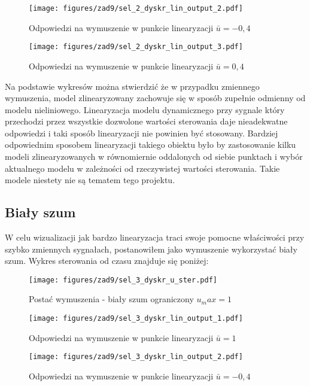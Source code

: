 \documentclass[a4paper,titlepage,11pt,floatssmall]{mwrep}
\begin{document}
\begin{figure}[H]
\centering
\texttt{[image: figures/zad9/sel\_2\_dyskr\_lin\_output\_2.pdf]}
\caption{Odpowiedzi na wymuszenie w punkcie linearyzacji $\bar{u} = -0,4$}
\end{figure}

\begin{figure}[H]
\centering
\texttt{[image: figures/zad9/sel\_2\_dyskr\_lin\_output\_3.pdf]}
\caption{Odpowiedzi na wymuszenie w punkcie linearyzacji $\bar{u} = 0,4$}
\end{figure}

Na podstawie wykresów można stwierdzić że w przypadku zmiennego wymuszenia, model zlinearyzowany zachowuje się w sposób zupełnie odmienny od modelu nieliniowego. Linearyzacja modelu dynamicznego przy sygnale który przechodzi przez wszystkie dozwolone wartości sterowania daje nieadekwatne odpowiedzi i taki sposób linearyzacji nie powinien być stosowany. Bardziej odpowiednim sposobem linearyzacji takiego obiektu było by zastosowanie kilku modeli zlinearyzowanych w równomiernie oddalonych od siebie punktach i wybór aktualnego modelu w zależności od rzeczywistej wartości sterowania. Takie modele niestety nie są tematem tego projektu.

\newpage
\subsection{Biały szum}
W celu wizualizacji jak bardzo linearyzacja traci swoje pomocne właściwości przy szybko zmiennych sygnałach, postanowiłem jako wymuszenie wykorzystać biały szum. Wykres sterowania od czasu znajduje się poniżej:

\begin{figure}[H]
\centering
\texttt{[image: figures/zad9/sel\_3\_dyskr\_u\_ster.pdf]}
\caption{Postać wymuszenia - biały szum ograniczony $u_max = 1$}
\end{figure}

\begin{figure}[H]
\centering
\texttt{[image: figures/zad9/sel\_3\_dyskr\_lin\_output\_1.pdf]}
\caption{Odpowiedzi na wymuszenie w punkcie linearyzacji $\bar{u} = 1$}
\end{figure}

\begin{figure}[H]
\centering
\texttt{[image: figures/zad9/sel\_3\_dyskr\_lin\_output\_2.pdf]}
\caption{Odpowiedzi na wymuszenie w punkcie linearyzacji $\bar{u} = -0,4$}
\end{figure}
\end{document}
